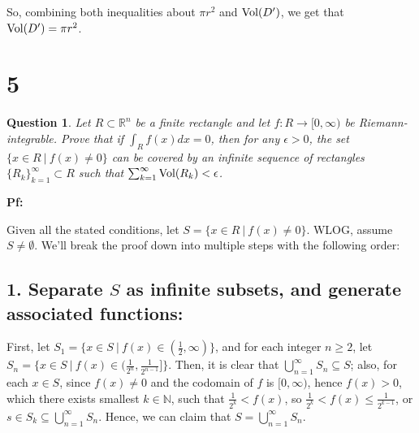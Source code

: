 \documentclass{article}
\newtheorem{question}{Question}
\begin{document}
So, combining both inequalities about $\pi r^2$ and $\textmd{Vol}(D')$, we get that $\textmd{Vol}(D')=\pi r^2$.

\break

\section*{5}
\begin{myBox}[]{}
    \begin{question}
        Let $R\subset\mathbb{R}^n$ be a finite rectangle and let $f:R\rightarrow[0,\infty)$ be Riemann-integrable. Prove that if $\int_Rf(x)dx = 0$, then for any $\epsilon>0$, the set $\{x\in R\ |\ f(x)\neq 0\}$ can be covered by an infinite sequence of rectangles $\{R_k\}_{k=1}^{\infty}\subset R$ such that $\sum_{k=1}^{\infty}\textmd{Vol}(R_k)<\epsilon$.
    \end{question}
\end{myBox}

\textbf{Pf:}

Given all the stated conditions, let $S=\{x\in R\ |\ f(x)\neq 0\}$. WLOG, assume $S\neq \emptyset$. We'll break the proof down into multiple steps with the following order:

\subsection*{1. Separate $S$ as infinite subsets, and generate associated functions:}
First, let $S_1 = \{x\in S\ |\ f(x)\in (\frac{1}{2},\infty)\}$, and for each integer $n\geq 2$, let $S_n=\{x\in S\ |\ f(x)\in (\frac{1}{2^n},\frac{1}{2^{n-1}}]\}$. Then, it is clear that $\bigcup_{n=1}^{\infty}S_n\subseteq S$; also, for each $x\in S$, since $f(x)\neq 0$ and the codomain of $f$ is $[0,\infty)$, hence $f(x)>0$, which there exists smallest $k\in\mathbb{N}$, such that $\frac{1}{2^k}<f(x)$, so $\frac{1}{2^k}<f(x)\leq \frac{1}{2^{k-1}}$, or $s\in S_k\subseteq \bigcup_{n=1}^{\infty}S_n$. Hence, we can claim that $S=\bigcup_{n=1}^{\infty}S_n$.
\end{document}
